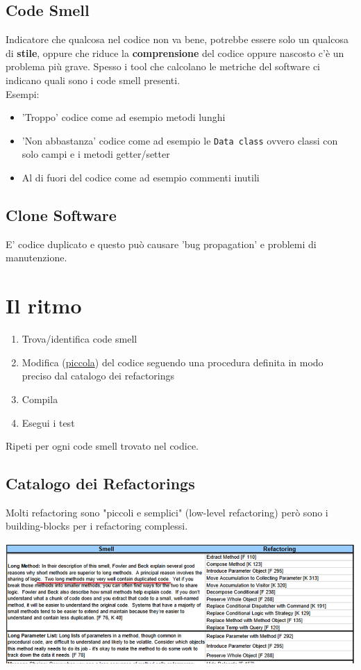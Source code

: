 \documentclass[12pt, a4paper]{report}
\begin{document}
\subsection{Code Smell}
Indicatore che qualcosa nel codice non va bene, potrebbe essere solo un qualcosa di \textbf{stile}, oppure che riduce la \textbf{comprensione} del codice oppure nascosto c'è un problema più grave. Spesso i tool che calcolano le metriche del software ci indicano quali sono i code smell presenti.\\
Esempi:
\begin{itemize}
    \item 'Troppo' codice come ad esempio metodi lunghi
    \item 'Non abbastanza' codice come ad esempio le \texttt{Data class} ovvero classi con solo campi e i metodi getter/setter
    \item Al di fuori del codice come ad esempio commenti inutili
\end{itemize}
\subsection{Clone Software}
E' codice duplicato e questo può causare 'bug propagation' e problemi di manutenzione.
\section{Il ritmo}
\begin{enumerate}
    \item Trova/identifica code smell
    \item Modifica (\underline{piccola}) del codice seguendo una procedura definita in modo preciso dal catalogo dei refactorings
    \item Compila
    \item Esegui i test
\end{enumerate}
Ripeti per ogni code smell trovato nel codice.
\subsection{Catalogo dei Refactorings}
Molti refactoring sono "piccoli e semplici" (low-level refactoring) però sono i building-blocks per i refactoring complessi.
\begin{center}
    \includegraphics[width=\textwidth]{Immagini/refactoringscatalog.png}
\end{center}
\end{document}
